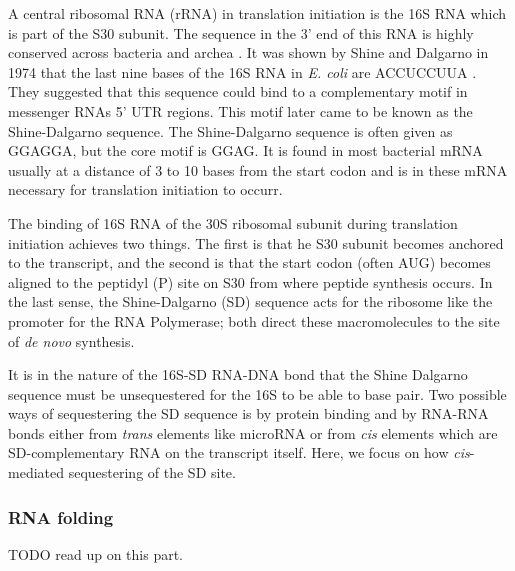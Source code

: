 A central ribosomal RNA (rRNA) in translation initiation is the 16S RNA which
is part of the S30 subunit. The sequence in the 3' end of this RNA is highly
conserved across bacteria and archea \cite{nakagawa_dynamic_2010}. It was shown
by Shine and Dalgarno in 1974 that the last nine bases of the 16S RNA in 
\textit{E. coli} are ACCUCCUUA \cite{shine_3-terminal_1974}. They suggested
that this sequence could bind to a complementary motif in messenger RNAs 5' UTR
regions. This motif later came to be known as the Shine-Dalgarno sequence. The
Shine-Dalgarno sequence is often given as GGAGGA, but the core motif is GGAG.
It is found in most bacterial mRNA usually at a distance of 3 to 10 bases from
the start codon \cite{chen_determination_1994-1} and is in these mRNA necessary
for translation initiation to occurr.

The binding of 16S RNA of the 30S ribosomal subunit during translation
initiation achieves two things. The first is that he S30 subunit becomes
anchored to the transcript, and the second is that the start codon (often AUG)
becomes aligned to the peptidyl (P) site on S30 from where peptide synthesis
occurs. In the last sense, the Shine-Dalgarno (SD) sequence acts for the
ribosome like the promoter for the RNA Polymerase; both direct these
macromolecules to the site of \textit{de novo} synthesis.

It is in the nature of the 16S-SD RNA-DNA bond that the Shine Dalgarno
sequence must be unsequestered for the 16S to be able to base pair. Two possible
ways of sequestering the SD sequence is by protein binding and by RNA-RNA bonds
either from \textit{trans} elements like microRNA or from \textit{cis} elements
which are SD-complementary RNA on the transcript itself. Here, we focus on how
\textit{cis}-mediated sequestering of the SD site.

\subsubsection{RNA folding}

TODO read up on this part.
